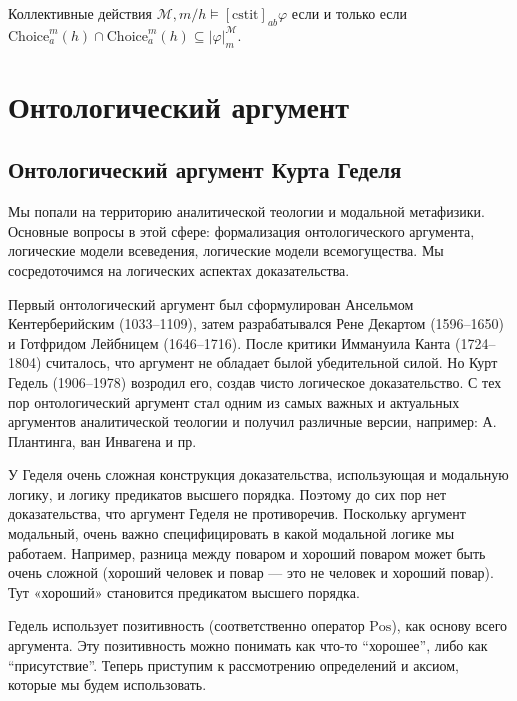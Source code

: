 \documentclass[openany]{book}
\theoremstyle{plain}
\theoremstyle{definition}
\begin{document}
Коллективные действия \(\mathcal{M}, m/h \models [\mathrm{cstit}]_{ab} \varphi\) если и только если \(\mathrm{Choice}_a^m (h) \cap \mathrm{Choice}_a^m (h) \subseteq |\varphi|_m^{\mathcal{M}}\).


\chapter{Онтологический аргумент}

\section{Онтологический аргумент Курта Геделя}

Мы попали на территорию аналитической теологии и модальной метафизики. Основные вопросы в этой сфере: формализация онтологического аргумента, логические модели всеведения, логические модели всемогущества.
Мы сосредоточимся на логических аспектах доказательства.

Первый онтологический аргумент был сформулирован Ансельмом Кентерберийским (1033--1109), затем разрабатывался Рене Декартом (1596--1650) и Готфридом Лейбницем (1646--1716). После критики Иммануила Канта (1724--1804) считалось, что аргумент не обладает былой убедительной силой. Но Курт Гедель (1906--1978) возродил его, создав чисто логическое доказательство. С тех пор онтологический аргумент стал одним из самых важных и актуальных аргументов аналитической теологии и получил различные версии, например: А. Плантинга, ван Инвагена и пр.

У Геделя очень сложная конструкция доказательства, использующая и модальную логику, и логику предикатов высшего порядка. Поэтому до сих пор нет доказательства, что аргумент Геделя не противоречив. Поскольку аргумент модальный, очень важно специфицировать в какой модальной логике мы работаем. Например, разница между поваром и хороший поваром может быть очень сложной (хороший человек и повар --- это не человек и хороший повар). Тут «хороший» становится предикатом высшего порядка.

Гедель использует позитивность (соответственно оператор \(\mathrm{Pos}\)), как основу всего аргумента. Эту позитивность можно понимать как что-то ``хорошее'', либо как ``присутствие''. Теперь приступим к рассмотрению определений и аксиом, которые мы будем использовать. 
\end{document}
